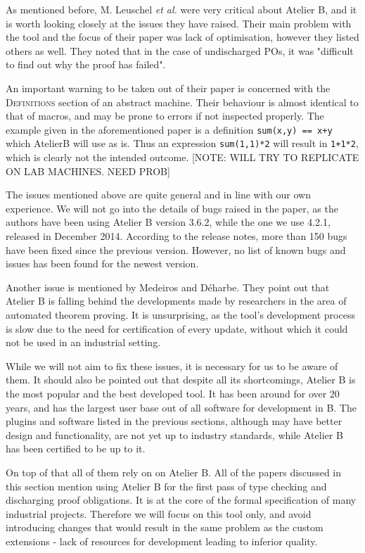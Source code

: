 \documentclass[11pt,journal]{IEEEtran}
\begin{document}
	As mentioned before, M. Leuschel \emph{et al.} were very critical about Atelier B, and it is worth looking closely at the issues they have raised. Their main problem with the tool and the focus of their paper was lack of optimisation, however they listed others as well. They noted that in the case of undischarged POs, it was "difficult to find out why the proof has failed".
	
	An important warning to be taken out of their paper is concerned with the \textsc{Definitions} section of an abstract machine. Their behaviour is almost identical to that of macros, and may be prone to errors if not inspected properly. The example given in the aforementioned paper is a definition \texttt{sum(x,y) == x+y} which AtelierB will use as is. Thus an expression \texttt{sum(1,1)*2} will result in \texttt{1+1*2}, which is clearly not the intended outcome. [NOTE: WILL TRY TO REPLICATE ON LAB MACHINES. NEED PROB]
	
	The issues mentioned above are quite general and in line with our own experience. We will not go into the details of bugs raised in the paper, as the authors have been using Atelier B version 3.6.2, while the one we use 4.2.1, released in December 2014. According to the release notes, more than 150 bugs have been fixed since the previous version. However, no list of known bugs and issues has been found for the newest version.\cite{release notes}
	
	Another issue is mentioned by Medeiros and D\'{e}harbe\cite{BEval}. They point out that Atelier B is falling behind the developments made by researchers in the area of automated theorem proving. It is unsurprising, as the tool's development process is slow due to the need for certification of every update, without which it could not be used in an industrial setting.
	
	While we will not aim to fix these issues, it is necessary for us to be aware of them. It should also be pointed out that despite all its shortcomings, Atelier B is the most popular and the best developed tool. It has been around for over 20 years, and has the largest user base out of all software for development in B. The plugins and software listed in the previous sections, although may have better design and functionality, are not yet up to industry standards, while Atelier B has been certified to be up to it.
	
	On top of that all of them rely on on Atelier B. All of the papers discussed in this section mention using Atelier B for the first pass of type checking and discharging proof obligations. It is at the core of the formal specification of many industrial projects. Therefore we will focus on this tool only, and avoid introducing changes that would result in the same problem as the custom extensions - lack of resources for development leading to inferior quality.
	
\end{document}
